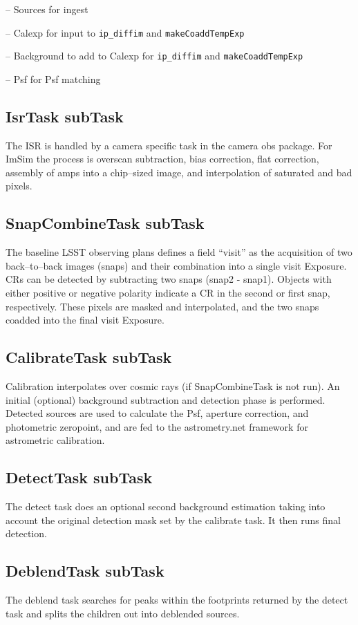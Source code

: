 \documentclass[prd, nofootinbib, floatfix, 11pt,tightenlines,times]{article}
\begin{document}
-- Sources for ingest

-- Calexp for input to {\tt ip\_diffim} and {\tt makeCoaddTempExp}

-- Background to add to Calexp for {\tt ip\_diffim} and {\tt makeCoaddTempExp}

-- Psf for Psf matching

\subsection{IsrTask subTask}
The ISR is handled by a camera specific task in the camera obs
package.  For ImSim the process is overscan subtraction, bias
correction, flat correction, assembly of amps into a chip--sized
image, and interpolation of saturated and bad pixels.

\subsection{SnapCombineTask subTask}
The baseline LSST observing plans defines a field ``visit'' as the
acquisition of two back--to--back images (snaps) and their combination
into a single visit Exposure.  CRs can be detected by subtracting two
snaps (snap2 - snap1). Objects with either positive or negative
polarity indicate a CR in the second or first snap, respectively.
These pixels are masked and interpolated, and the two snaps coadded
into the final visit Exposure.


\subsection{CalibrateTask subTask} 
Calibration interpolates over cosmic rays (if
SnapCombineTask is not run).  An initial (optional)
background subtraction and detection phase is performed.  Detected
sources are used to calculate the Psf, aperture correction, and
photometric zeropoint, and are fed to the astrometry.net framework for
astrometric calibration.

\subsection{DetectTask subTask}
The detect task does an optional second background estimation taking
into account the original detection mask set by the calibrate task.
It then runs final detection.

\subsection{DeblendTask subTask}
The deblend task searches for peaks within the footprints returned by
the detect task and splits the children out into deblended sources.
\end{document}
